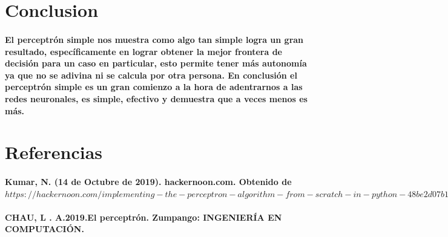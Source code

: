 \documentclass[10pt,a4paper]{article}
\begin{document}
\section{Conclusion}
\paragraph{El perceptr\'on simple nos muestra como algo tan simple logra un gran resultado, espec\'ificamente en lograr obtener la mejor frontera de decisi\'on para un caso en particular, esto permite tener m\'as autonom\'ia ya que no se adivina ni se calcula por otra persona. En conclusi\'on el perceptr\'on simple es un gran comienzo a la hora de adentrarnos a las redes neuronales, es simple, efectivo y demuestra que a veces menos es m\'as.}

\section{Referencias}
\paragraph{Kumar, N. (14 de Octubre de 2019). hackernoon.com. Obtenido de 
$https://hackernoon.com/implementing-the-perceptron-algorithm-from-scratch-in-python-48be2d07b1c0$
}

\paragraph{CHAU, L . A.2019.El perceptr\'on. Zumpango: INGENIER\'IA EN COMPUTACI\'ON.}
\end{document}
